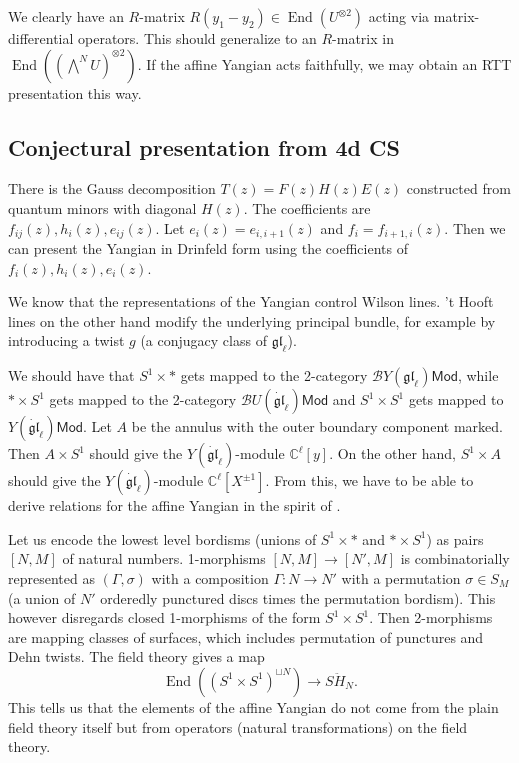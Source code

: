 \documentclass[11pt]{report}
\theoremstyle{definition}
\theoremstyle{remark}
\theoremstyle{remark}
\newcommand{\End}{\operatorname{End}}
\newcommand{\C}{\mathbb{C}}
\begin{document}
We clearly have an $R$-matrix $R(y_1-y_2) \in \End(U^{\otimes 2})$ acting via matrix-differential operators. This should generalize to an $R$-matrix in $\End((\bigwedge^N U)^{\otimes 2})$. If the affine Yangian acts faithfully, we may obtain an RTT presentation this way.

\subsection{Conjectural presentation from 4d CS}

There is the Gauss decomposition $T(z) = F(z) H(z) E(z)$ constructed from quantum minors with diagonal $H(z)$. The coefficients are $f_{ij}(z), h_i(z), e_{ij}(z)$. Let $e_i(z) = e_{i,i+1}(z)$ and $f_i = f_{i+1,i}(z)$. Then we can present the Yangian in Drinfeld form using the coefficients of $f_i(z),h_i(z),e_i(z)$.

We know that the representations of the Yangian control Wilson lines. 't Hooft lines on the other hand modify the underlying principal bundle, for example by introducing a twist $g$ (a conjugacy class of $\mathfrak{gl}_\ell$).

We should have that $S^1 \times *$ gets mapped to the 2-category $\mathcal{B}Y(\mathfrak{gl}_\ell)\mathsf{Mod}$, while $* \times S^1$ gets mapped to the 2-category $\mathcal{B}U(\dot{\mathfrak{gl}}_\ell)\mathsf{Mod}$ and $S^1 \times S^1$ gets mapped to $Y(\dot{\mathfrak{gl}}_\ell)\mathsf{Mod}$. Let $A$ be the annulus with the outer boundary component marked. Then $A \times S^1$ should give the $Y(\dot{\mathfrak{gl}}_\ell)$-module $\C^\ell[y]$. On the other hand, $S^1 \times A$ should give the $Y(\dot{\mathfrak{gl}}_\ell)$-module $\C^\ell[X^{\pm 1}]$. From this, we have to be able to derive relations for the affine Yangian in the spirit of \cite{article:costello:2018b}.

Let us encode the lowest level bordisms (unions of $S^1 \times *$ and $* \times S^1$) as pairs $[N,M]$ of natural numbers. 1-morphisms $[N,M] \to [N',M]$ is combinatorially represented as $(\Gamma,\sigma)$ with a composition $\Gamma: N \to N'$ with a permutation $\sigma \in S_M$ (a union of $N'$ orderedly punctured discs times the permutation bordism). This however disregards closed 1-morphisms of the form $S^1 \times S^1$. Then 2-morphisms are mapping classes of surfaces, which includes permutation of punctures and Dehn twists. The field theory gives a map
\begin{equation*}
\End((S^1 \times S^1)^{\sqcup N}) \to S \ddot H_N.
\end{equation*}
This tells us that the elements of the affine Yangian do not come from the plain field theory itself but from operators (natural transformations) on the field theory.
\end{document}
